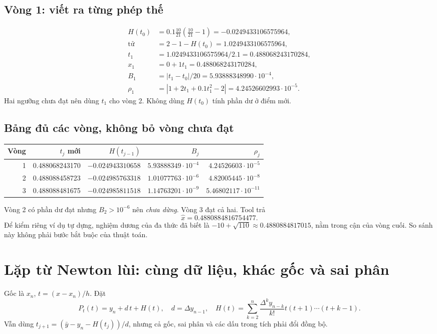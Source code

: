 \subsection{Vòng 1: viết ra từng phép thế}
\begin{align*}
H(t_0)&=0.1\frac{10}{21}\left(\frac{10}{21}-1\right)
       =-0.0249433106575964,\\
\text{tử}&=2-1-H(t_0)=1.0249433106575964,\\
t_1&=1.0249433106575964/2.1=0.488068243170284,\\
x_1&=0+1t_1=0.488068243170284,\\
B_1&=|t_1-t_0|/20=5.93888348990\cdot10^{-4},\\
\rho_1&=|1+2t_1+0.1t_1^2-2|=4.24526602993\cdot10^{-5}.
\end{align*}
Hai ngưỡng chưa đạt nên dùng $t_1$ cho vòng 2. Không dùng $H(t_0)$ tính phần dư ở điểm mới.

\subsection{Bảng đủ các vòng, không bỏ vòng chưa đạt}
\begin{center}\small
\begin{tabular}{@{}rrrrr@{}}\toprule
Vòng & $t_j$ mới & $H(t_{j-1})$ & $B_j$ & $\rho_j$\\\midrule
1 & 0.488068243170 & $-0.024943310658$ & $5.93888349\cdot10^{-4}$ & $4.24526603\cdot10^{-5}$\\
2 & 0.488088458723 & $-0.024985763318$ & $1.01077763\cdot10^{-6}$ & $4.82005445\cdot10^{-8}$\\
3 & 0.488088481675 & $-0.024985811518$ & $1.14763201\cdot10^{-9}$ & $5.46802117\cdot10^{-11}$\\\bottomrule
\end{tabular}\end{center}
Vòng 2 có phần dư đạt nhưng $B_2>10^{-6}$ nên \emph{chưa dừng}. Vòng 3 đạt cả hai. Tool trả
\[
 \widehat x=0.4880884816754477.
\]
Để kiểm riêng ví dụ tự dựng, nghiệm dương của đa thức đã biết là $-10+\sqrt{110}\approx0.4880884817015$, nằm trong cận của vòng cuối. So sánh này không phải bước bắt buộc của thuật toán.

\section{Lặp từ Newton lùi: cùng dữ liệu, khác gốc và sai phân}
\label{sec:inverse-backward}
Gốc là $x_n$, $t=(x-x_n)/h$. Đặt
\[
 P_t(t)=y_n+d\,t+H(t),\quad d=\Delta y_{n-1},\quad
 H(t)=\sum_{k=2}^n\frac{\Delta^ky_{n-k}}{k!}t(t+1)\cdots(t+k-1).
\]
Vẫn dùng $t_{j+1}=(\bar y-y_n-H(t_j))/d$, nhưng cả gốc, sai phân và các dấu trong tích phải đổi đồng bộ.

